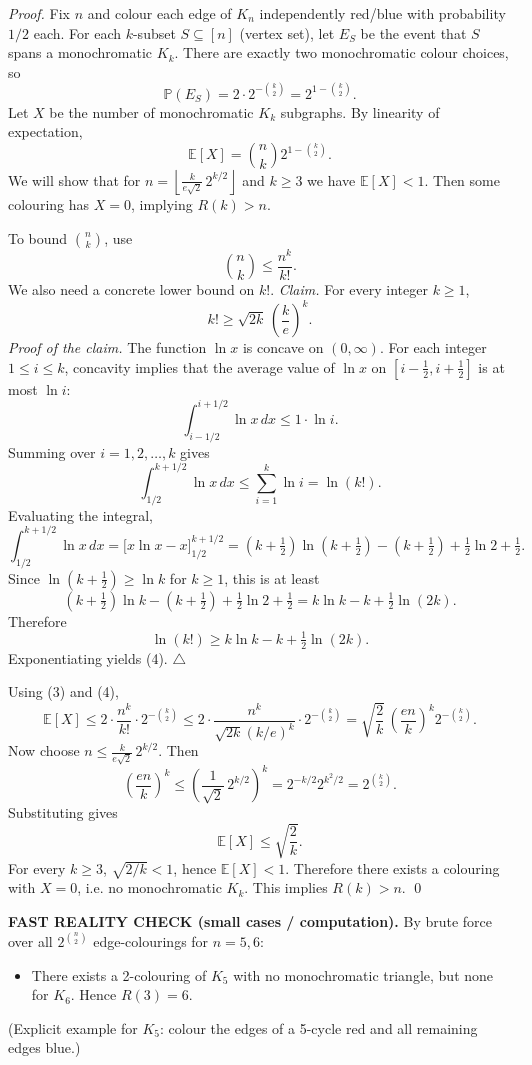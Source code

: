 \emph{Proof.}
Fix $n$ and colour each edge of $K_n$ independently red/blue with probability $1/2$ each.
For each $k$-subset $S\subseteq [n]$ (vertex set), let $E_S$ be the event that $S$ spans a monochromatic $K_k$.
There are exactly two monochromatic colour choices, so
\[
\mathbb{P}(E_S)=2\cdot 2^{-\binom{k}{2}} = 2^{1-\binom{k}{2}}.
\]
Let $X$ be the number of monochromatic $K_k$ subgraphs. By linearity of expectation,
\[
\mathbb{E}[X]=\binom{n}{k} 2^{1-\binom{k}{2}}.
\]
We will show that for $n=\left\lfloor \frac{k}{e\sqrt{2}}\,2^{k/2}\right\rfloor$ and $k\ge 3$ we have $\mathbb{E}[X]<1$.
Then some colouring has $X=0$, implying $R(k)>n$.

To bound $\binom{n}{k}$, use
\[
\binom{n}{k} \le \frac{n^k}{k!}. \tag{3}
\]
We also need a concrete lower bound on $k!$.
\emph{Claim.} For every integer $k\ge 1$,
\[
 k! \ge \sqrt{2k}\,\left(\frac{k}{e}\right)^k. \tag{4}
\]
\emph{Proof of the claim.}
The function $\ln x$ is concave on $(0,\infty)$.
For each integer $1\le i\le k$, concavity implies that the average value of $\ln x$ on $[i-\tfrac12,i+\tfrac12]$ is at most $\ln i$:
\[
\int_{i-1/2}^{i+1/2} \ln x\,dx \le 1\cdot \ln i.
\]
Summing over $i=1,2,\dots,k$ gives
\[
\int_{1/2}^{k+1/2} \ln x\,dx \le \sum_{i=1}^k \ln i = \ln(k!).
\]
Evaluating the integral,
\[
\int_{1/2}^{k+1/2} \ln x\,dx = \bigl[x\ln x - x\bigr]_{1/2}^{k+1/2}
= (k+\tfrac12)\ln(k+\tfrac12) - (k+\tfrac12) + \tfrac12\ln 2 + \tfrac12.
\]
Since $\ln(k+\tfrac12)\ge \ln k$ for $k\ge 1$, this is at least
\[
(k+\tfrac12)\ln k - (k+\tfrac12) + \tfrac12\ln 2 + \tfrac12
= k\ln k - k + \tfrac12\ln(2k).
\]
Therefore
\[
\ln(k!) \ge k\ln k - k + \tfrac12\ln(2k).
\]
Exponentiating yields (4).
\hfill $\triangle$

Using (3) and (4),
\[
\mathbb{E}[X]\le 2\cdot \frac{n^k}{k!}\cdot 2^{-\binom{k}{2}}
\le 2\cdot \frac{n^k}{\sqrt{2k}(k/e)^k}\cdot 2^{-\binom{k}{2}}
= \sqrt{\frac{2}{k}}\,\left(\frac{en}{k}\right)^k 2^{-\binom{k}{2}}.
\]
Now choose $n\le \frac{k}{e\sqrt{2}}\,2^{k/2}$.
Then
\[
\left(\frac{en}{k}\right)^k \le \left(\frac{1}{\sqrt{2}}\,2^{k/2}\right)^k = 2^{-k/2} 2^{k^2/2} = 2^{\binom{k}{2}}.
\]
Substituting gives
\[
\mathbb{E}[X] \le \sqrt{\frac{2}{k}}.
\]
For every $k\ge 3$, $\sqrt{2/k}<1$, hence $\mathbb{E}[X]<1$.
Therefore there exists a colouring with $X=0$, i.e. no monochromatic $K_k$.
This implies $R(k)>n$.
\qed

\medskip
\textbf{FAST REALITY CHECK (small cases / computation).}
By brute force over all $2^{\binom{n}{2}}$ edge-colourings for $n=5,6$:
\begin{itemize}
\item There exists a 2-colouring of $K_5$ with no monochromatic triangle, but none for $K_6$.
Hence $R(3)=6$.
\end{itemize}
(Explicit example for $K_5$: colour the edges of a 5-cycle red and all remaining edges blue.)

